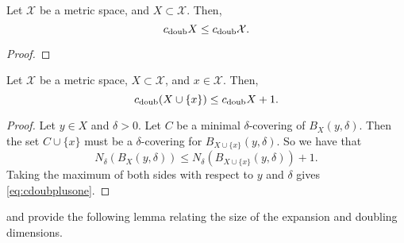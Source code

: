 \documentclass[thesis.tex]{subfiles}
\newcommand{\set}[1]{\mathcal {#1}}
\newcommand{\doubdim}{\text{dim}_\textnormal{doub}}
\newcommand{\cdoub}{c_\textnormal{doub}}
\begin{document}

\begin{lemma}
    Let $\set X$ be a metric space, and $X\subset\set X$.
    Then,
    \begin{equation}
        \label{eq:cdoubinclusion}
        \cdoub X \le \cdoub \set X.
    \end{equation}
\end{lemma}

\begin{proof}
%
\end{proof}

\begin{lemma}
    Let $\set X$ be a metric space, $X\subset\set X$, and $x\in\set X$.
    Then,
    \begin{equation}
        \label{eq:cdoubplusone}
        \cdoub (X\cup\{x\}) \le \cdoub X + 1.
    \end{equation}
\end{lemma}
\begin{proof}
    Let $y\in X$ and $\delta>0$.
    Let $C$ be a minimal $\delta$-covering of $B_X(y,\delta)$.
    Then the set $C\cup\{x\}$ must be a $\delta$-covering for $B_{X\cup\{x\}}(y,\delta)$.
    So we have that 
    \begin{equation}
        N_\delta(B_X(y,\delta)) \le N_\delta(B_{X\cup\{x\}}(y,\delta))+1
        .
    \end{equation}
    Taking the maximum of both sides with respect to $y$ and $\delta$ gives \eqref{eq:cdoubplusone}.
\end{proof}


\noindent
\citet{gupta2003bounded} and \cite{krauthgamer2004navigating} provide the following lemma relating the size of the expansion and doubling dimensions.
\end{document}
